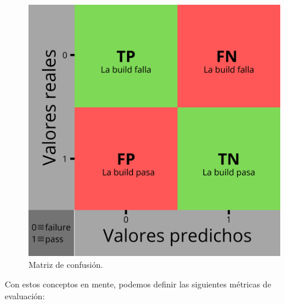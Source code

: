 \begin{figure}[H]
      \centering
      \includegraphics[scale=0.50]{images/Confusion matrix.png}
      \caption{Matriz de confusión.}
      \label{fig:confusion_matrix}
  \end{figure}

Con estos conceptos en mente, podemos definir las siguientes métricas de evaluación:

